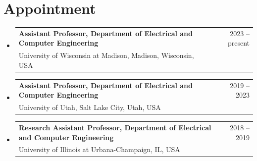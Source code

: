 \documentclass[A4,11pt]{article}
\makeatletter
\newcommand{\CVItem}[1]{
  \item\small{
    {#1 \vspace{-2pt}}
  }
}
\newcommand{\CVSubheading}[4]{
  \vspace{-2pt}\item
    \begin{tabular*}{0.97\textwidth}[t]{l@{\extracolsep{\fill}}r}
      \textbf{#1} & #2 \\
      \small#3 & \small #4 \\
    \end{tabular*}\vspace{-7pt}
}
\newcommand{\CVSubHeadingListStart}{\begin{itemize}[leftmargin=0.5cm, label={}]}
\newcommand{\CVSubHeadingListEnd}{\end{itemize}}
\newcommand{\CVItemListStart}{\begin{itemize}}
\newcommand{\CVItemListEnd}{\end{itemize}\vspace{-5pt}}
\makeatother
\begin{document}

\section{Appointment}
  \CVSubHeadingListStart
    \CVSubheading
      {{Assistant Professor, Department of Electrical and Computer Engineering}}{2023 -- present}
      {University of Wisconsin at Madison, Madison, Wisconsin, USA}{}
    \CVSubheading
      {{Assistant Professor, Department of Electrical and Computer Engineering}}{2019 -- 2023}
      {University of Utah, Salt Lake City, Utah, USA}{}
    \CVSubheading
      {{Research Assistant Professor, Department of Electrical and Computer Engineering}}{2018 -- 2019}
      {University of Illinois at Urbana-Champaign, IL, USA}{}
  \CVSubHeadingListEnd

\end{document}
